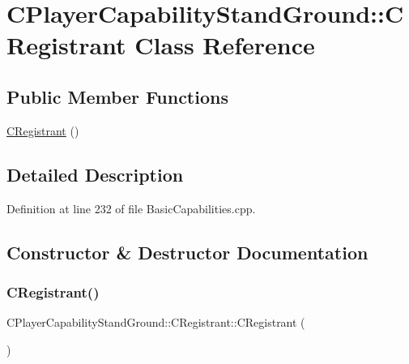 \hypertarget{classCPlayerCapabilityStandGround_1_1CRegistrant}{}\section{C\+Player\+Capability\+Stand\+Ground\+:\+:C\+Registrant Class Reference}
\label{classCPlayerCapabilityStandGround_1_1CRegistrant}
\subsection*{Public Member Functions}
\begin{DoxyCompactItemize}
\item 
\hyperlink{classCPlayerCapabilityStandGround_1_1CRegistrant_ad7c015829711721bab4ce08ef385e8ea}{C\+Registrant} ()
\end{DoxyCompactItemize}


\subsection{Detailed Description}


Definition at line 232 of file Basic\+Capabilities.\+cpp.



\subsection{Constructor \& Destructor Documentation}
\hypertarget{classCPlayerCapabilityStandGround_1_1CRegistrant_ad7c015829711721bab4ce08ef385e8ea}{}\label{classCPlayerCapabilityStandGround_1_1CRegistrant_ad7c015829711721bab4ce08ef385e8ea} 
\subsubsection{\texorpdfstring{C\+Registrant()}{CRegistrant()}}
{\footnotesize\ttfamily C\+Player\+Capability\+Stand\+Ground\+::\+C\+Registrant\+::\+C\+Registrant (\begin{DoxyParamCaption}{ }\end{DoxyParamCaption})}




